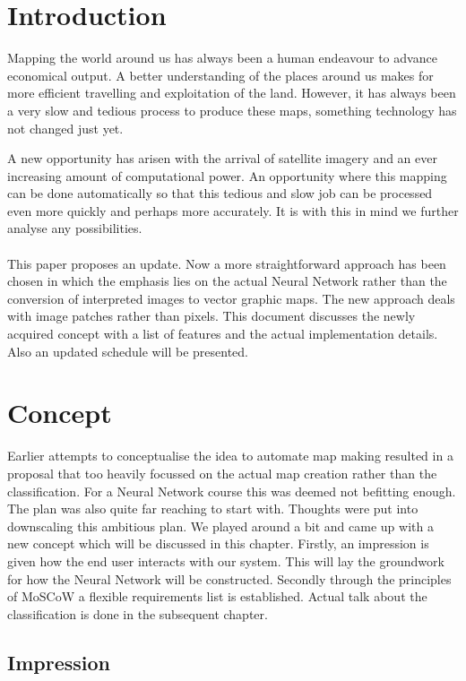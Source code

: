 \documentclass[a4paper,onecolumn]{report}
\begin{document}
\tableofcontents

\chapter{Introduction}

Mapping the world around us has always been a human endeavour to advance economical output. A better understanding of the places around us makes for more efficient travelling and exploitation of the land. However, it has always been a very slow and tedious process to produce these maps, something technology has not changed just yet.

A new opportunity has arisen with the arrival of satellite imagery and an ever increasing amount of computational power. An opportunity where this mapping can be done automatically so that this tedious and slow job can be processed even more quickly and perhaps more accurately. It is with this in mind we further analyse any possibilities.\\
\\
This paper proposes an update. Now a more straightforward approach has been chosen in which the emphasis lies on the actual Neural Network rather than the conversion of interpreted images to vector graphic maps. The new approach deals with image patches rather than pixels. This document discusses the newly acquired concept with a list of features and the actual implementation details. Also an updated schedule will be presented. 

\chapter{Concept}
Earlier attempts to conceptualise the idea to automate map making resulted in a proposal that too heavily focussed on the actual map creation rather than the classification. For a Neural Network course this was deemed not befitting enough. The plan was also quite far reaching to start with. Thoughts were put into downscaling this ambitious plan. We played around a bit and came up with a new concept which will be discussed in this chapter. Firstly, an impression is given how the end user interacts with our system. This will lay the groundwork for how the Neural Network will be constructed. Secondly through the principles of MoSCoW a flexible requirements list is established. Actual talk about the classification is done in the subsequent chapter.

\section{Impression}
\end{document}
